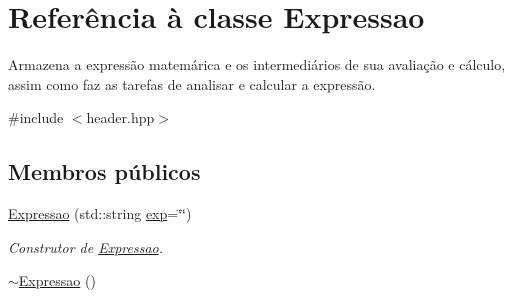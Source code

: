 \hypertarget{class_expressao}{\section{Referência à classe Expressao}
\label{class_expressao}
}


Armazena a expressão matemárica e os intermediários de sua avaliação e cálculo, assim como faz as tarefas de analisar e calcular a expressão.  




{\ttfamily \#include $<$header.\-hpp$>$}

\subsection*{Membros públicos}
\begin{DoxyCompactItemize}
\item 
\hyperlink{class_expressao_a2f9ed2017ca70735ffb389bcdbb5c897}{Expressao} (std\-::string \hyperlink{class_expressao_a2a9e296041b11983d15c8cd52849cd9b}{exp}=\char`\"{}\char`\"{})
\begin{DoxyCompactList}\small\item\em Construtor de \hyperlink{class_expressao}{Expressao}. \end{DoxyCompactList}\item 
\hypertarget{class_expressao_a24d1d65d24e920db4eca6f2e0b51a9c7}{\hyperlink{class_expressao_a24d1d65d24e920db4eca6f2e0b51a9c7}{$\sim$\-Expressao} ()}\label{class_expressao_a24d1d65d24e920db4eca6f2e0b51a9c7}


\end{DoxyCompactItemize}
